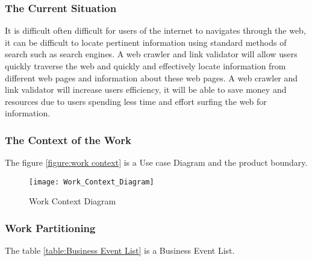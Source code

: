\documentclass[titlepage]{article}
\begin{document}
\subsubsection*{The Current Situation}

It is difficult often difficult for users of the internet to navigates through the web, it can be difficult to locate pertinent information using standard methods of search such as search engines. A web crawler and link validator will allow users quickly traverse the web and quickly and effectively locate information from different web pages and information about these web pages. A web crawler and link validator will increase users efficiency, it will be able to save money and resources due to users spending less time and effort surfing the web for information.\newline

\subsubsection*{The Context of the Work }
The figure \ref{figure:work context} is a Use case Diagram and the product boundary.
\begin{figure}[h!]
  \caption{Work Context Diagram}
  \centering
    \texttt{[image: Work\_Context\_Diagram]}
\end{figure}
\label{figure:work context}
\subsubsection*{Work Partitioning}
The table \ref{table:Business Event List} is a Business Event List.
\end{document}
